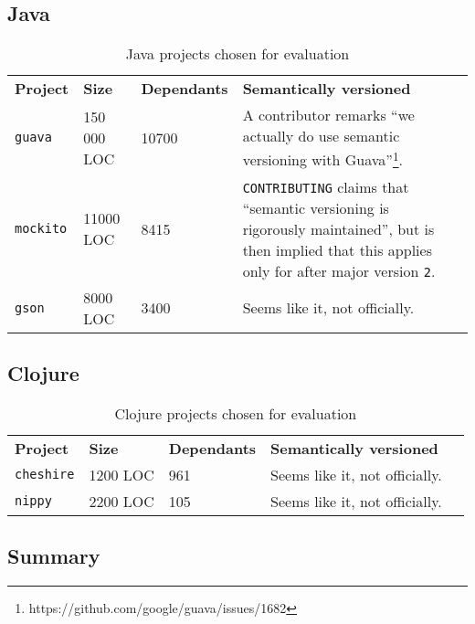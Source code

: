 \documentclass{l4proj}
\newcommand\genericstyle{\lstset{basicstyle=\ttm}}
\newcommand\codeinline[1]{{\genericstyle\lstinline!#1!}}
\begin{document}
\subsection{Java}

\begin{table}[H]
\label{JavaProjectsForEvaluation}
\centering
\begin{tabular}{|l|l|l||l|l|}
\textbf{Project} & \textbf{Size} & \textbf{Dependants} & \textbf{Semantically versioned} \\
\codeinline{guava} & 150 000 LOC & 10700 & A contributor remarks ``we
actually do use semantic versioning with
Guava''\footnote{https://github.com/google/guava/issues/1682}. \\
\codeinline{mockito} & 11000 LOC & 8415 & \codeinline{CONTRIBUTING}
claims that ``semantic versioning is rigorously maintained'', but is
then implied that this applies only for after major version
\codeinline{2}. \\
\codeinline{gson} & 8000 LOC & 3400 & Seems like it, not officially.
\end{tabular}
\caption{Java projects chosen for evaluation}
\end{table}

\subsection{Clojure}

\begin{table}[H]
\label{ClojureProjectsForEvaluation}
\centering
\begin{tabular}{|l|l|l||l|l|}
\textbf{Project} & \textbf{Size} & \textbf{Dependants} & \textbf{Semantically versioned} \\
\codeinline{cheshire} & 1200 LOC & 961 & Seems like it, not
officially. \\
\codeinline{nippy} & 2200 LOC & 105 & Seems like it, not officially.
\end{tabular}
\caption{Clojure projects chosen for evaluation}
\end{table}

\subsection{Summary}

\end{document}
